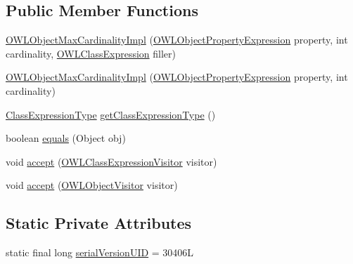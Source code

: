 \subsection*{Public Member Functions}
\begin{DoxyCompactItemize}
\item 
\hyperlink{classuk_1_1ac_1_1manchester_1_1cs_1_1owl_1_1owlapi_1_1_o_w_l_object_max_cardinality_impl_a882052c4349c6c0a51e7e5d52702a609}{O\-W\-L\-Object\-Max\-Cardinality\-Impl} (\hyperlink{interfaceorg_1_1semanticweb_1_1owlapi_1_1model_1_1_o_w_l_object_property_expression}{O\-W\-L\-Object\-Property\-Expression} property, int cardinality, \hyperlink{interfaceorg_1_1semanticweb_1_1owlapi_1_1model_1_1_o_w_l_class_expression}{O\-W\-L\-Class\-Expression} filler)
\item 
\hyperlink{classuk_1_1ac_1_1manchester_1_1cs_1_1owl_1_1owlapi_1_1_o_w_l_object_max_cardinality_impl_a4b04a8490144b02449087b03377aa08a}{O\-W\-L\-Object\-Max\-Cardinality\-Impl} (\hyperlink{interfaceorg_1_1semanticweb_1_1owlapi_1_1model_1_1_o_w_l_object_property_expression}{O\-W\-L\-Object\-Property\-Expression} property, int cardinality)
\item 
\hyperlink{enumorg_1_1semanticweb_1_1owlapi_1_1model_1_1_class_expression_type}{Class\-Expression\-Type} \hyperlink{classuk_1_1ac_1_1manchester_1_1cs_1_1owl_1_1owlapi_1_1_o_w_l_object_max_cardinality_impl_ae2f161f271fb17e0f4adada40f350023}{get\-Class\-Expression\-Type} ()
\item 
boolean \hyperlink{classuk_1_1ac_1_1manchester_1_1cs_1_1owl_1_1owlapi_1_1_o_w_l_object_max_cardinality_impl_ac041d0fb9f8b8b47ea83ffc371d9d077}{equals} (Object obj)
\item 
void \hyperlink{classuk_1_1ac_1_1manchester_1_1cs_1_1owl_1_1owlapi_1_1_o_w_l_object_max_cardinality_impl_a30983276ab81bea08285e24c88c73f0e}{accept} (\hyperlink{interfaceorg_1_1semanticweb_1_1owlapi_1_1model_1_1_o_w_l_class_expression_visitor}{O\-W\-L\-Class\-Expression\-Visitor} visitor)
\item 
void \hyperlink{classuk_1_1ac_1_1manchester_1_1cs_1_1owl_1_1owlapi_1_1_o_w_l_object_max_cardinality_impl_a462f5af4cbbd3eacd3650e6764448549}{accept} (\hyperlink{interfaceorg_1_1semanticweb_1_1owlapi_1_1model_1_1_o_w_l_object_visitor}{O\-W\-L\-Object\-Visitor} visitor)
\end{DoxyCompactItemize}
\subsection*{Static Private Attributes}
\begin{DoxyCompactItemize}
\item 
static final long \hyperlink{classuk_1_1ac_1_1manchester_1_1cs_1_1owl_1_1owlapi_1_1_o_w_l_object_max_cardinality_impl_aae71ca84a52f5ab350a60c0cee8ce66c}{serial\-Version\-U\-I\-D} = 30406\-L
\end{DoxyCompactItemize}
